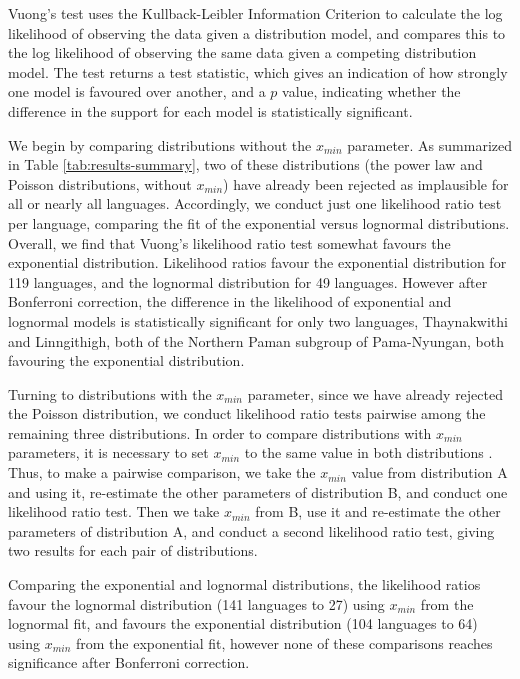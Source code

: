 Vuong's \autocite*{vuong_likelihood_1989} test uses the Kullback-Leibler Information Criterion \autocite{kullback_information_1951} to calculate the log likelihood of observing the data given a distribution model, and compares this to the log likelihood of observing the same data given a competing distribution model. The test returns a test statistic, which gives an indication of how strongly one model is favoured over another, and a \(p\) value, indicating whether the difference in the support for each model is statistically significant.

We begin by comparing distributions without the \(x_{min}\) parameter. As summarized in Table \ref{tab:results-summary}, two of these distributions (the power law and Poisson distributions, without \(x_{min}\)) have already been rejected as implausible for all or nearly all languages. Accordingly, we conduct just one likelihood ratio test per language, comparing the fit of the exponential versus lognormal distributions. Overall, we find that Vuong's likelihood ratio test somewhat favours the exponential distribution. Likelihood ratios favour the exponential distribution for 119 languages, and the lognormal distribution for 49 languages. However after Bonferroni correction, the difference in the likelihood of exponential and lognormal models is statistically significant for only two languages, Thaynakwithi and Linngithigh, both of the Northern Paman subgroup of Pama-Nyungan, both favouring the exponential distribution.

Turning to distributions with the \(x_{min}\) parameter, since we have already rejected the Poisson distribution, we conduct likelihood ratio tests pairwise among the remaining three distributions. In order to compare distributions with \(x_{min}\) parameters, it is necessary to set \(x_{min}\) to the same value in both distributions \autocite{gillespie_fitting_2014}. Thus, to make a pairwise comparison, we take the \(x_{min}\) value from distribution A and using it, re-estimate the other parameters of distribution B, and conduct one likelihood ratio test. Then we take \(x_{min}\) from B, use it and re-estimate the other parameters of distribution A, and conduct a second likelihood ratio test, giving two results for each pair of distributions.

Comparing the exponential and lognormal distributions, the likelihood ratios favour the lognormal distribution (141 languages to 27) using \(x_{min}\) from the lognormal fit, and favours the exponential distribution (104 languages to 64) using \(x_{min}\) from the exponential fit, however none of these comparisons reaches significance after Bonferroni correction.

